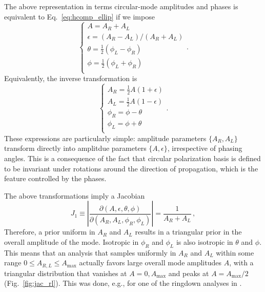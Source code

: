 \documentclass[aps,prd,twocolumn,superscriptaddress,preprintnumbers,floatfix,nofootinbib]{revtex4-2}
\begin{document}
The above representation in terms circular-mode amplitudes and phases is equivalent to Eq.~\eqref{eq:hcomp_ellip} if we impose
\begin{equation} \label{eq:Cphi_to_Aellip}
\begin{cases}
A = A_R + A_L \\
\epsilon = (A_R - A_L)/(A_R + A_L) \\ 
\theta = \frac{1}{2}(\phi_L - \phi_R)\\
\phi = \frac{1}{2}(\phi_L + \phi_R)\\
\end{cases} .
\end{equation}
Equivalently, the inverse transformation is 
\begin{equation}
\begin{cases}
A_R = \frac{1}{2} A \left(1 + \epsilon\right) \\
A_L = \frac{1}{2} A \left(1 - \epsilon\right) \\
\phi_R = \phi - \theta \\ 
\phi_L = \phi + \theta \\ 
\end{cases} .
\end{equation}
These expressions are particularly simple: amplitude parameters $\{ A_R, A_L\}$ transform directly into amplitdue parameters $\{A, \epsilon\}$, irrespective of phasing angles.
This is a consequence of the fact that circular polarization basis is defined to be invariant under rotations around the direction of propagation, which is the feature controlled by the phases.

The above transformations imply a Jacobian
\begin{equation}
J_1 \equiv \left| \frac{\partial(A,\epsilon,\theta,\phi)}{\partial(A_R, A_L, \phi_R, \phi_L)}\right| =  \frac{1}{A_R + A_L}\, ,
\end{equation}
Therefore, a prior uniform in $A_R$ and $A_L$ results in a triangular prior in the overall amplitude of the mode.
Isotropic in $\phi_R$ and $\phi_L$ is also isotropic in $\theta$ and $\phi$.
This means that an analysis that samples uniformly in $A_R$ and $A_L$ within some range $0 \leq A_{R,L} \leq A_\mathrm{max}$ actually favors large overall mode amplitudes $A$, with a triangular distribution that vanishes at $A=0,A_\mathrm{max}$ and peaks at $A = A_\mathrm{max}/2$ (Fig.~\ref{fig:jac_rl}).
This was done, e.g., for one of the ringdown analyses in \cite{LIGOScientific:2020tif}.
\end{document}
